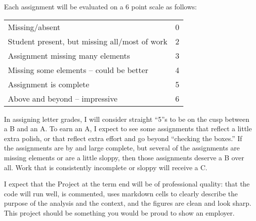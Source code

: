 \documentclass[11pt, a4paper]{article}
\begin{document}
Each assignment will be evaluated on a 6 point scale as follows:  
\begin{center}

\begin{tabular}{l l}
Missing/absent & 0 \\
Student present, but missing all/most of work & 2 \\
Assignment missing many elements & 3 \\
Missing some elements -- could be better & 4 \\
Assignment is complete & 5 \\
Above and beyond -- impressive & 6 \\
\end{tabular}

\end{center}

In assigning letter grades, I will consider straight ``5''s to be on the cusp between a B and an A.  To earn an A, I expect to see some assignments that reflect a little extra polish, or that reflect extra effort and go beyond ``checking the boxes.''  If the assignments are by and large complete, but several of the assignments are missing elements or are a little sloppy, then those assignments deserve a B over all.  Work that is consistently incomplete or sloppy will receive a C.  

I expect that the Project at the term end will be of professional quality: that the code will run well, is commented, uses markdown cells to clearly describe the purpose of the analysis and the context, and the figures are clean and look sharp.  This project should be something you would be proud to show an employer.

\end{document}
